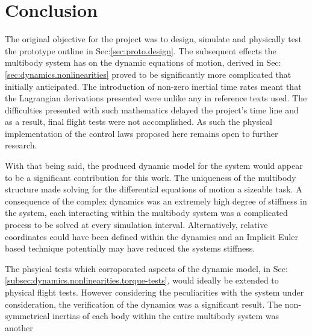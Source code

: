\chapter{Conclusion}
\label{ch:conclusion}
The original objective for the project was to design, simulate and physically test the prototype outline in Sec:\ref{sec:proto.design}. The subsequent effects the multibody system has on the dynamic equations of motion, derived in Sec:\ref{sec:dynamics.nonlinearities} proved to be significantly more complicated that initially anticipated. The introduction of non-zero inertial time rates meant that the Lagrangian derivations presented were unlike any in reference texts used. The difficulties presented with such mathematics delayed the project's time line and as a result, final flight tests were not accomplished. As such the physical implementation of the control laws proposed here remains open to further research.
\par
With that being said, the produced dynamic model for the system would appear to be a significant contribution for this work. The uniqueness of the multibody structure made solving for the differential equations of motion a sizeable task. A consequence of the complex dynamics was an extremely high degree of stiffness in the system, each interacting within the multibody system was a complicated process to be solved at every simulation interval. Alternatively, relative coordinates could have been defined within the dynamics and an Implicit Euler based technique potentially may have reduced the systems stiffness.
\par
The phsyical tests which corroporated aspects of the dynamic model, in Sec:\ref{subsec:dynamics.nonlinearities.torque-tests}, would ideally be extended to physical flight tests. However considering the peculiarities with the system under consideration, the verification of the dynamics was a significant result. The non-symmetrical inertias of each body within the entire multibody system was another 


